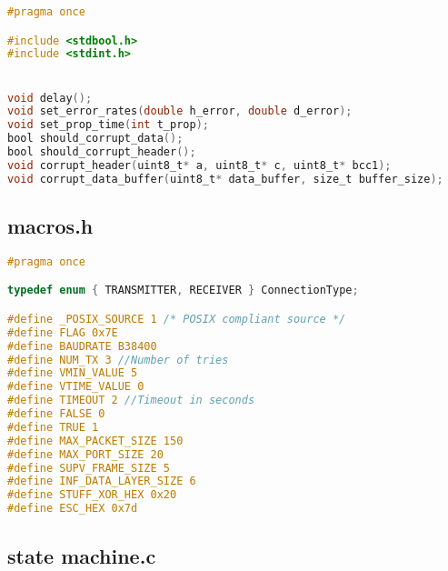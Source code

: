 \begin{lstlisting}[language=C, caption=error.h]
#pragma once

#include <stdbool.h>
#include <stdint.h>


void delay();
void set_error_rates(double h_error, double d_error);
void set_prop_time(int t_prop);
bool should_corrupt_data();
bool should_corrupt_header();
void corrupt_header(uint8_t* a, uint8_t* c, uint8_t* bcc1);
void corrupt_data_buffer(uint8_t* data_buffer, size_t buffer_size);
\end{lstlisting}

\subsection{macros.h}

\begin{lstlisting}[language=C, caption=macros.h]
#pragma once

typedef enum { TRANSMITTER, RECEIVER } ConnectionType;

#define _POSIX_SOURCE 1 /* POSIX compliant source */
#define FLAG 0x7E
#define BAUDRATE B38400
#define NUM_TX 3 //Number of tries
#define VMIN_VALUE 5
#define VTIME_VALUE 0
#define TIMEOUT 2 //Timeout in seconds
#define FALSE 0
#define TRUE 1
#define MAX_PACKET_SIZE 150
#define MAX_PORT_SIZE 20
#define SUPV_FRAME_SIZE 5
#define INF_DATA_LAYER_SIZE 6
#define STUFF_XOR_HEX 0x20
#define ESC_HEX 0x7d

\end{lstlisting}

\subsection{state \textunderscore machine.c}

